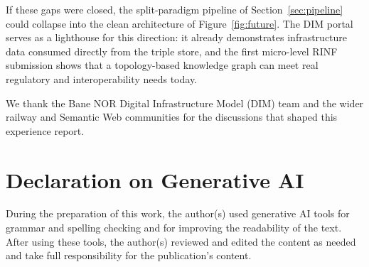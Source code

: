 \documentclass[twocolumn]{ceurart}
\begin{document}
If these gaps were closed, the split-paradigm pipeline of
Section~\ref{sec:pipeline} could collapse into the clean architecture of
Figure~\ref{fig:future}. The DIM portal~\cite{dim} serves as a lighthouse for
this direction: it already demonstrates infrastructure data consumed directly
from the triple store, and the first micro-level RINF submission shows that a
topology-based knowledge graph can meet real regulatory and interoperability
needs today.

\begin{acknowledgments}
  We thank the Bane NOR Digital Infrastructure Model (DIM) team and the wider
  railway and Semantic Web communities for the discussions that shaped this
  experience report.
\end{acknowledgments}

\section*{Declaration on Generative AI}
During the preparation of this work, the author(s) used generative AI tools for
grammar and spelling checking and for improving the readability of the text.
After using these tools, the author(s) reviewed and edited the content as needed
and take full responsibility for the publication's content.


\end{document}
